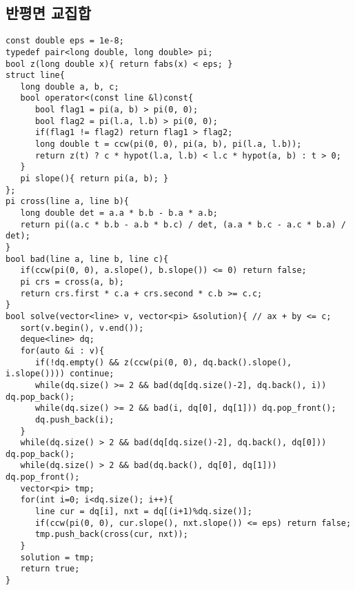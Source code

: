 \documentclass[landscape, 8pt, a4paper, oneside, twocolumn]{extarticle}
\begin{document}
\subsection{반평면 교집합}
\begin{verbatim}
const double eps = 1e-8;
typedef pair<long double, long double> pi;
bool z(long double x){ return fabs(x) < eps; }
struct line{
   long double a, b, c;
   bool operator<(const line &l)const{
      bool flag1 = pi(a, b) > pi(0, 0);
      bool flag2 = pi(l.a, l.b) > pi(0, 0);
      if(flag1 != flag2) return flag1 > flag2;
      long double t = ccw(pi(0, 0), pi(a, b), pi(l.a, l.b));
      return z(t) ? c * hypot(l.a, l.b) < l.c * hypot(a, b) : t > 0;
   }
   pi slope(){ return pi(a, b); }
};
pi cross(line a, line b){
   long double det = a.a * b.b - b.a * a.b;
   return pi((a.c * b.b - a.b * b.c) / det, (a.a * b.c - a.c * b.a) / det);
}
bool bad(line a, line b, line c){
   if(ccw(pi(0, 0), a.slope(), b.slope()) <= 0) return false;
   pi crs = cross(a, b);
   return crs.first * c.a + crs.second * c.b >= c.c;
}
bool solve(vector<line> v, vector<pi> &solution){ // ax + by <= c;
   sort(v.begin(), v.end());
   deque<line> dq;
   for(auto &i : v){
      if(!dq.empty() && z(ccw(pi(0, 0), dq.back().slope(), i.slope()))) continue;
      while(dq.size() >= 2 && bad(dq[dq.size()-2], dq.back(), i)) dq.pop_back();
      while(dq.size() >= 2 && bad(i, dq[0], dq[1])) dq.pop_front();
      dq.push_back(i);
   }
   while(dq.size() > 2 && bad(dq[dq.size()-2], dq.back(), dq[0])) dq.pop_back();
   while(dq.size() > 2 && bad(dq.back(), dq[0], dq[1])) dq.pop_front();
   vector<pi> tmp;
   for(int i=0; i<dq.size(); i++){
      line cur = dq[i], nxt = dq[(i+1)%dq.size()];
      if(ccw(pi(0, 0), cur.slope(), nxt.slope()) <= eps) return false;
      tmp.push_back(cross(cur, nxt));
   }
   solution = tmp;
   return true;
}
\end{verbatim}
\end{document}
